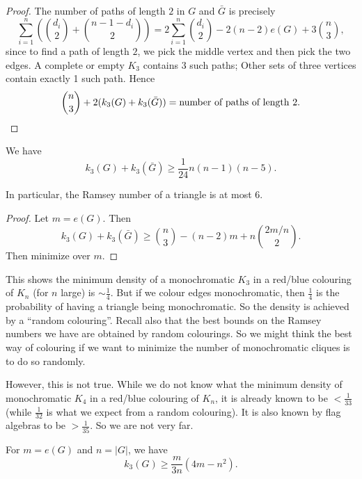 \documentclass[a4paper]{article}
\begin{document}
\begin{proof}
  The number of paths of length $2$ in $G$ and $\bar{G}$ is precisely
  \[
    \sum_{i = 1}^n \left(\binom{d_i}{2} + \binom{n - 1 - d_i}{2}\right) = 2 \sum_{i = 1}^n \binom{d_i}{2} - 2 (n - 2) e(G) + 3 \binom{n}{3},
  \]
  since to find a path of length $2$, we pick the middle vertex and then pick the two edges. A complete or empty $K_3$ contains $3$ such paths; Other sets of three vertices contain exactly 1 such path. Hence
  \[
    \binom{n}{3} + 2 (k_3(G) + k_3(\bar{G})) = \text{number of paths of length $2$}.\qedhere
  \]
\end{proof}
\begin{cor}[Goodman, 1959]
  We have
  \[
    k_3(G) + k_3(\bar{G}) \geq \frac{1}{24} n(n - 1)(n - 5).
  \]
\end{cor}

In particular, the Ramsey number of a triangle is at most $6$.

\begin{proof}
  Let $m = e(G)$. Then
  \[
    k_3(G) + k_3(\bar{G}) \geq \binom{n}{3} - (n - 2) m + n \binom{2m/n}{2}. %
  \]
  Then minimize over $m$.
\end{proof}

This shows the minimum density of a monochromatic $K_3$ in a red/blue colouring of $K_n$ (for $n$ large) is $\sim \frac{1}{4}$. But if we colour edges monochromatic, then $\frac{1}{4}$ is the probability of having a triangle being monochromatic. So the density is achieved by a ``random colouring''. Recall also that the best bounds on the Ramsey numbers we have are obtained by random colourings. So we might think the best way of colouring if we want to minimize the number of monochromatic cliques is to do so randomly.

However, this is not true. While we do not know what the minimum density of monochromatic $K_4$ in a red/blue colouring of $K_n$, it is already known to be $< \frac{1}{33}$ (while $\frac{1}{32}$ is what we expect from a random colouring). It is also known by flag algebras to be $> \frac{1}{35}$. So we are not very far.

\begin{cor}
  For $m = e(G)$ and $n = |G|$, we have
  \[
    k_3(G) \geq \frac{m}{3n}(4m - n^2).
  \]
\end{cor}
\end{document}
